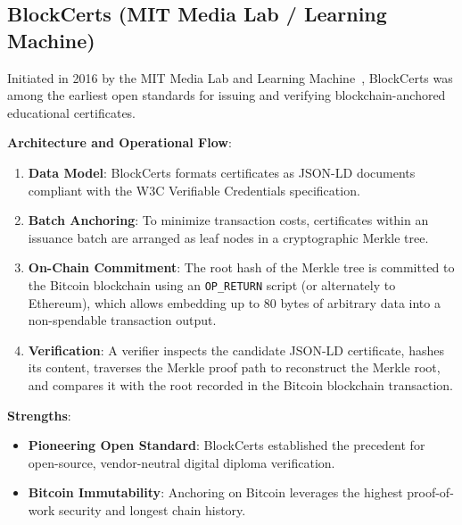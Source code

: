 \subsection{BlockCerts (MIT Media Lab / Learning Machine)}

Initiated in 2016 by the MIT Media Lab and Learning Machine~\cite{Schmidt2015CertificatesReputation,Blockcerts2017,Grech2017BlockchainInEducation}, BlockCerts was among the earliest open standards for issuing and verifying blockchain-anchored educational certificates. 

\textbf{Architecture and Operational Flow}:
\begin{enumerate}
    \item \textbf{Data Model}: BlockCerts formats certificates as JSON-LD documents compliant with the W3C Verifiable Credentials specification.
    \item \textbf{Batch Anchoring}: To minimize transaction costs, certificates within an issuance batch are arranged as leaf nodes in a cryptographic Merkle tree.
    \item \textbf{On-Chain Commitment}: The root hash of the Merkle tree is committed to the Bitcoin blockchain using an \texttt{OP\_RETURN} script (or alternately to Ethereum), which allows embedding up to 80 bytes of arbitrary data into a non-spendable transaction output.
    \item \textbf{Verification}: A verifier inspects the candidate JSON-LD certificate, hashes its content, traverses the Merkle proof path to reconstruct the Merkle root, and compares it with the root recorded in the Bitcoin blockchain transaction.
\end{enumerate}

\textbf{Strengths}:
\begin{itemize}
    \item \textbf{Pioneering Open Standard}: BlockCerts established the precedent for open-source, vendor-neutral digital diploma verification.
    \item \textbf{Bitcoin Immutability}: Anchoring on Bitcoin leverages the highest proof-of-work security and longest chain history.
\end{itemize}

